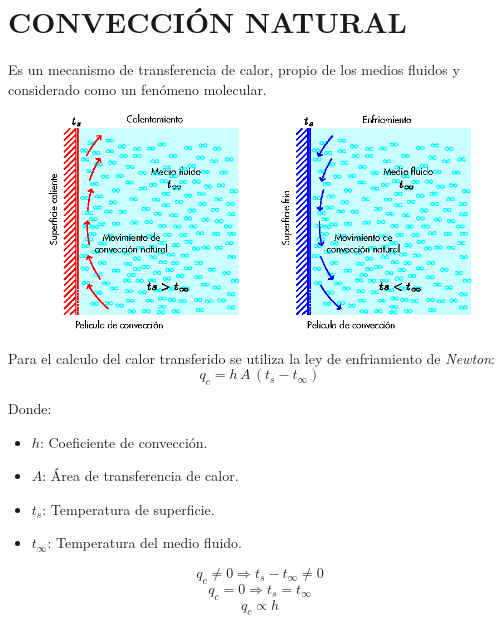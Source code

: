 \chapter{CONVECCIÓN NATURAL}

Es un mecanismo de transferencia de calor, propio de los medios fluidos y 
considerado como un fenómeno molecular.

\begin{figure}[!h]
\centering
\includegraphics[scale=1.40]{figura04_01.eps}
\end{figure}

Para el calculo del calor transferido se utiliza la ley de enfriamiento de
\emph{Newton}:
\begin{equation*}
    q_c = h\,A\,(t_s-t_\infty)
\end{equation*}

Donde:
\begin{itemize}
    \item $h$: Coeficiente de convección.
    \item $A$: Área de transferencia de calor.
    \item $t_s$: Temperatura de superficie.
    \item $t_\infty$: Temperatura del medio fluido.
\end{itemize}

\begin{equation*}
    q_c \neq 0 \Longrightarrow t_s-t_\infty \neq 0
\end{equation*}
\begin{equation*}
    q_c = 0 \Longrightarrow t_s = t_\infty
\end{equation*}
\begin{equation*}
    q_c \propto h
\end{equation*}

